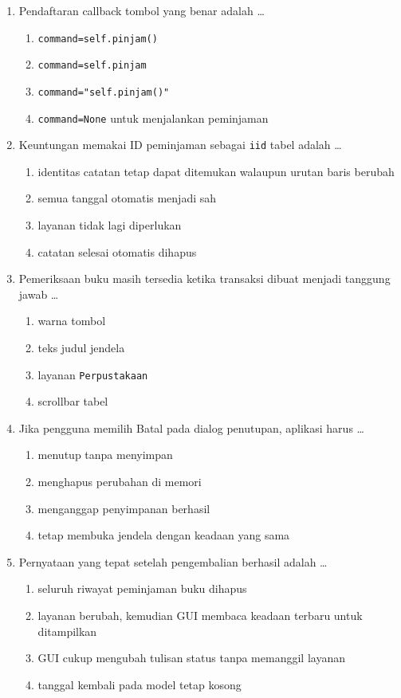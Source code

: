 \begin{enumerate}
  \item Pendaftaran callback tombol yang benar adalah \ldots
  \begin{enumerate}[label=\alph*.,itemsep=0pt]
    \item \texttt{command=self.pinjam()}
    \item \texttt{command=self.pinjam}
    \item \texttt{command="self.pinjam()"}
    \item \texttt{command=None} untuk menjalankan peminjaman
  \end{enumerate}
  \item Keuntungan memakai ID peminjaman sebagai \texttt{iid} tabel adalah \ldots
  \begin{enumerate}[label=\alph*.,itemsep=0pt]
    \item identitas catatan tetap dapat ditemukan walaupun urutan baris berubah
    \item semua tanggal otomatis menjadi sah
    \item layanan tidak lagi diperlukan
    \item catatan selesai otomatis dihapus
  \end{enumerate}
  \item Pemeriksaan buku masih tersedia ketika transaksi dibuat menjadi tanggung jawab \ldots
  \begin{enumerate}[label=\alph*.,itemsep=0pt]
    \item warna tombol
    \item teks judul jendela
    \item layanan \texttt{Perpustakaan}
    \item scrollbar tabel
  \end{enumerate}
  \item Jika pengguna memilih Batal pada dialog penutupan, aplikasi harus \ldots
  \begin{enumerate}[label=\alph*.,itemsep=0pt]
    \item menutup tanpa menyimpan
    \item menghapus perubahan di memori
    \item menganggap penyimpanan berhasil
    \item tetap membuka jendela dengan keadaan yang sama
  \end{enumerate}
  \item Pernyataan yang tepat setelah pengembalian berhasil adalah \ldots
  \begin{enumerate}[label=\alph*.,itemsep=0pt]
    \item seluruh riwayat peminjaman buku dihapus
    \item layanan berubah, kemudian GUI membaca keadaan terbaru untuk ditampilkan
    \item GUI cukup mengubah tulisan status tanpa memanggil layanan
    \item tanggal kembali pada model tetap kosong
  \end{enumerate}
\end{enumerate}

